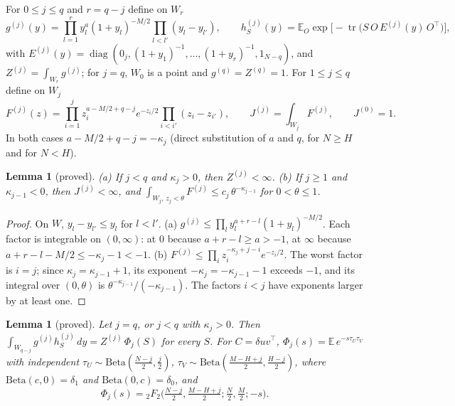 \documentclass[11pt]{article}
\newcommand{\tr}{\operatorname{tr}}
\newcommand{\E}{\mathbb{E}}
\newcommand{\hypF}[2]{{}_{#1}F_{#2}}
\newcommand{\diag}{\operatorname{diag}}
\newtheorem{lemma}[theorem]{Lemma}
\theoremstyle{remark}
\begin{document}
For $0\le j\le q$ and $r=q-j$ define on $W_r$
\begin{equation}
  g^{(j)}(y)=\prod_{l=1}^r y_l^{a}(1+y_l)^{-M/2}\prod_{l<l'}(y_l-y_{l'}),\qquad
  h^{(j)}_S(y)=\E_O\exp\!\big[-\tr\big(S\,O\,E^{(j)}(y)\,O^\top\big)\big],
  \label{eq:gj}
\end{equation}
with $E^{(j)}(y)=\diag(0_j,(1+y_1)^{-1},\dots,(1+y_r)^{-1},1_{N-q})$, and $Z^{(j)}=\int_{W_r}g^{(j)}$; for $j=q$, $W_0$ is a point and $g^{(q)}=Z^{(q)}=1$.
For $1\le j\le q$ define on $W_j$
\begin{equation}
  F^{(j)}(z)=\prod_{i=1}^j z_i^{a-M/2+q-j}e^{-z_i/2}\prod_{i<i'}(z_i-z_{i'}),\qquad J^{(j)}=\int_{W_j}F^{(j)},\qquad J^{(0)}=1.
  \label{eq:Fj}
\end{equation}
In both cases $a-M/2+q-j=-\kappa_j$ (direct substitution of $a$ and $q$, for $N\ge H$ and for $N<H$).

\begin{lemma}[proved]\label{lem:integrable}
(a) If $j<q$ and $\kappa_j>0$, then $Z^{(j)}<\infty$.
(b) If $j\ge1$ and $\kappa_{j-1}<0$, then $J^{(j)}<\infty$, and $\int_{W_j,\,z_j<\theta}F^{(j)}\le c_j\,\theta^{-\kappa_{j-1}}$ for $0<\theta\le1$.
\end{lemma}

\begin{proof}
On $W$, $y_l-y_{l'}\le y_l$ for $l<l'$.
(a) $g^{(j)}\le\prod_ly_l^{a+r-l}(1+y_l)^{-M/2}$.
Each factor is integrable on $(0,\infty)$: at $0$ because $a+r-l\ge a>-1$, at $\infty$ because $a+r-l-M/2\le-\kappa_j-1<-1$.
(b) $F^{(j)}\le\prod_iz_i^{-\kappa_j+j-i}e^{-z_i/2}$.
The worst factor is $i=j$; since $\kappa_j=\kappa_{j-1}+1$, its exponent $-\kappa_j=-\kappa_{j-1}-1$ exceeds $-1$, and its integral over $(0,\theta)$ is $\theta^{-\kappa_{j-1}}/(-\kappa_{j-1})$.
The factors $i<j$ have exponents larger by at least one.
\end{proof}

\begin{lemma}[proved]\label{lem:stratum}
Let $j=q$, or $j<q$ with $\kappa_j>0$.
Then $\int_{W_{q-j}}g^{(j)}h^{(j)}_S\,dy=Z^{(j)}\,\Phi_j(S)$ for every $S$.
For $C=\delta uv^\top$, $\Phi_j(s)=\E\,e^{-s\tau_U\tau_V}$ with independent $\tau_U\sim\mathrm{Beta}(\tfrac{N-j}2,\tfrac j2)$, $\tau_V\sim\mathrm{Beta}(\tfrac{M-H+j}2,\tfrac{H-j}2)$, where $\mathrm{Beta}(c,0)=\delta_1$ and $\mathrm{Beta}(0,c)=\delta_0$, and
\begin{equation}
  \Phi_j(s)=\hypF22\big(\tfrac{N-j}2,\tfrac{M-H+j}2;\tfrac N2,\tfrac M2;-s\big).
  \label{eq:2F2}
\end{equation}
\end{lemma}
\end{document}
